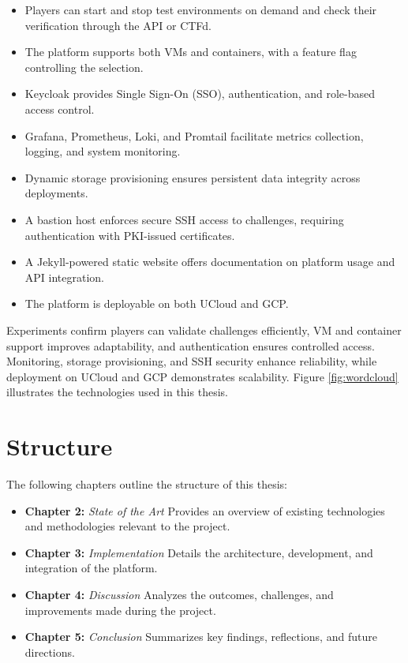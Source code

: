 \begin{itemize}
    \item Players can start and stop test environments on demand and check their verification through the API or CTFd.
    \item The platform supports both VMs and containers, with a feature flag controlling the selection.
    \item Keycloak provides Single Sign-On (SSO), authentication, and role-based access control.
    \item Grafana, Prometheus, Loki, and Promtail facilitate metrics collection, logging, and system monitoring.
    \item Dynamic storage provisioning ensures persistent data integrity across deployments.
    \item A bastion host enforces secure SSH access to challenges, requiring authentication with PKI-issued certificates.
    \item A Jekyll-powered static website offers documentation on platform usage and API integration.
    \item The platform is deployable on both UCloud and GCP.
\end{itemize}

Experiments confirm players can validate challenges efficiently, VM and container support improves adaptability, and authentication ensures controlled access. Monitoring, storage provisioning, and SSH security enhance reliability, while deployment on UCloud and GCP demonstrates scalability. Figure \ref{fig:wordcloud} illustrates the technologies used in this thesis.

\section{Structure} 
The following chapters outline the structure of this thesis:
\begin{itemize}
    \item \textbf{Chapter 2:} \textit{State of the Art} Provides an overview of existing technologies and methodologies relevant to the project.
    \item \textbf{Chapter 3:} \textit{Implementation} Details the architecture, development, and integration of the platform.
    \item \textbf{Chapter 4:} \textit{Discussion} Analyzes the outcomes, challenges, and improvements made during the project.
    \item \textbf{Chapter 5:} \textit{Conclusion} Summarizes key findings, reflections, and future directions.
\end{itemize}

